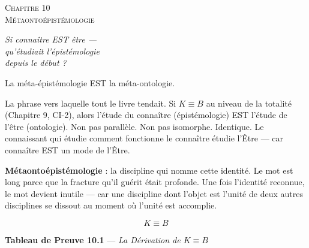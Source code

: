 \documentclass[10pt, openany, oneside]{book}
\renewcommand{\large}{\fontsize{11.5}{14}\selectfont}
\renewcommand{\huge}{\fontsize{17}{21}\selectfont}
\begin{document}
\newpage

\begin{center}
    {\huge\scshape Chapitre 10}\\[0.3em]
    {\large\scshape Métaontoépistémologie}
\end{center}

\vspace{1.5em}

\begin{center}
    \itshape
    Si connaître EST être ---\\
    qu'étudiait l'épistémologie\\
    depuis le début ?
\end{center}

\vspace{2em}


\noindent La méta-épistémologie EST la méta-ontologie.

La phrase vers laquelle tout le livre tendait. Si $K \equiv B$ au niveau de la totalité (Chapitre 9, CI-2), alors l'étude du connaître (épistémologie) EST l'étude de l'être (ontologie). Non pas parallèle. Non pas isomorphe. Identique. Le connaissant qui étudie comment fonctionne le connaître étudie l'Être --- car connaître EST un mode de l'Être.

\textbf{Métaontoépistémologie} : la discipline qui nomme cette identité. Le mot est long parce que la fracture qu'il guérit était profonde. Une fois l'identité reconnue, le mot devient inutile --- car une discipline dont l'objet est l'unité de deux autres disciplines se dissout au moment où l'unité est accomplie.

$$\boxed{K \equiv B}$$

\vspace{0.5em}

\textbf{Tableau de Preuve 10.1} --- \textit{La Dérivation de $K \equiv B$}

\vspace{0.5em}
\end{document}
